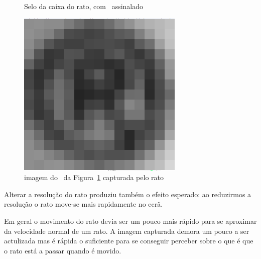 \documentclass[a4paper]{article}
\begin{document}
\begin{figure}[b]
\centering

\caption{Selo da caixa do rato, com \textregistered\ assinalado}
\label{fig:Cherry_box}
\end{figure}

\begin{figure}[t]
\centering
\includegraphics{rprintscreen}
\caption{imagem do \textregistered\ da Figura~\ref{fig:Cherry_box} capturada pelo rato}
\label{fig:registed_capture}
\end{figure}

Alterar a resolução do rato produziu também o efeito esperado: ao reduzirmos a resolução o rato move-se mais rapidamente no ecrã.

Em geral o movimento do rato devia ser um pouco mais rápido para se aproximar da velocidade normal de um rato. A imagem capturada demora um pouco a ser actulizada mas é rápida o suficiente para se conseguir perceber sobre o que é que o rato está a passar quando é movido.
\end{document}
